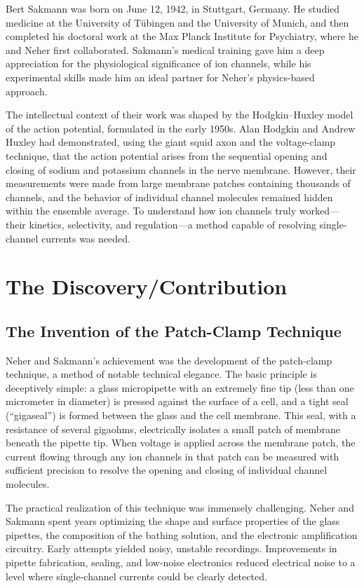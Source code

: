 Bert Sakmann was born on June 12, 1942, in Stuttgart, Germany. He studied medicine at the University of T{\"u}bingen and the University of Munich, and then completed his doctoral work at the Max Planck Institute for Psychiatry, where he and Neher first collaborated. Sakmann's medical training gave him a deep appreciation for the physiological significance of ion channels, while his experimental skills made him an ideal partner for Neher's physics-based approach.

The intellectual context of their work was shaped by the Hodgkin--Huxley model of the action potential, formulated in the early 1950s. Alan Hodgkin and Andrew Huxley had demonstrated, using the giant squid axon and the voltage-clamp technique, that the action potential arises from the sequential opening and closing of sodium and potassium channels in the nerve membrane. However, their measurements were made from large membrane patches containing thousands of channels, and the behavior of individual channel molecules remained hidden within the ensemble average. To understand how ion channels truly worked---their kinetics, selectivity, and regulation---a method capable of resolving single-channel currents was needed.

\section{The Discovery/Contribution}

\subsection{The Invention of the Patch-Clamp Technique}

Neher and Sakmann's achievement was the development of the patch-clamp technique, a method of notable technical elegance. The basic principle is deceptively simple: a glass micropipette with an extremely fine tip (less than one micrometer in diameter) is pressed against the surface of a cell, and a tight seal (``gigaseal'') is formed between the glass and the cell membrane. This seal, with a resistance of several gigaohms, electrically isolates a small patch of membrane beneath the pipette tip. When voltage is applied across the membrane patch, the current flowing through any ion channels in that patch can be measured with sufficient precision to resolve the opening and closing of individual channel molecules.

The practical realization of this technique was immensely challenging. Neher and Sakmann spent years optimizing the shape and surface properties of the glass pipettes, the composition of the bathing solution, and the electronic amplification circuitry. Early attempts yielded noisy, unstable recordings. Improvements in pipette fabrication, sealing, and low-noise electronics reduced electrical noise to a level where single-channel currents could be clearly detected.


